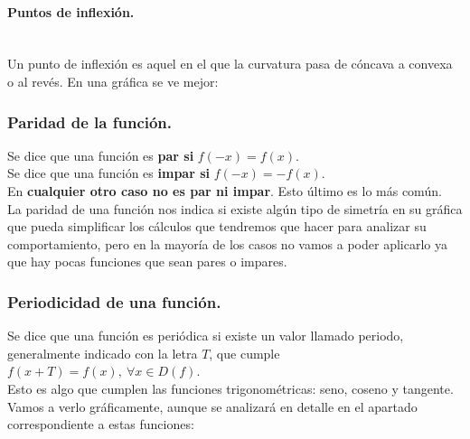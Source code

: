 \documentclass[a4paper,11pt,answers]{exam}
\begin{document}
\paragraph{Puntos de inflexión.}\mbox{}\\
Un punto de inflexión es aquel en el que la curvatura pasa de cóncava a convexa o al revés. En una gráfica se ve mejor:
\begin{center}
\end{center}
\subsubsection{Paridad de la función.}
Se dice que una función es \textbf{par si} $f(-x) = f(x)$.\\

Se dice que una función es \textbf{impar si} $f(-x) = -f(x)$.\\

En \textbf{cualquier otro caso no es par ni impar}. Esto último es lo más común.\\

La paridad de una función nos indica si existe algún tipo de simetría en su gráfica que pueda simplificar los cálculos que tendremos que hacer para analizar su comportamiento, pero en la mayoría de los casos no vamos a poder aplicarlo ya que hay pocas funciones que sean pares o impares.

\subsubsection{Periodicidad de una función.}
Se dice que una función es periódica si existe un valor llamado periodo, generalmente indicado con la letra $T$, que cumple $f(x + T) = f(x),\ \forall x \in D(f)$.\\
Esto es algo que cumplen las funciones trigonométricas: seno, coseno y tangente. Vamos a verlo gráficamente, aunque se analizará en detalle en el apartado correspondiente a estas funciones:
\end{document}
